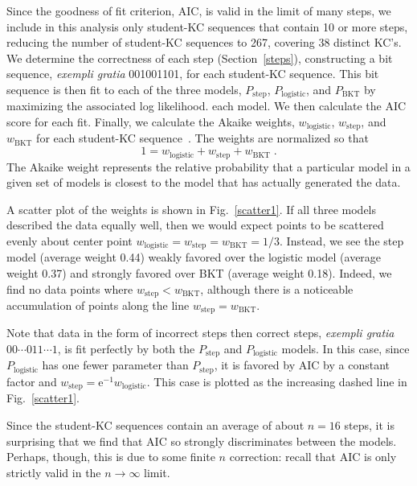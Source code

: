\documentclass{edm_template}
\begin{document}
Since the goodness of fit criterion, AIC, is valid in the limit of
many steps, we include in this analysis only student-KC sequences that
contain 10 or more steps, reducing the number of student-KC sequences
to 267, covering 38 distinct KC's.  We determine the correctness of
each step (Section~\ref{steps}), constructing a bit sequence, {\em
exempli gratia} 001001101, for each student-KC sequence.  This bit
sequence is then fit to each of the three models, $P_\mathrm{step}$,
$P_\mathrm{logistic}$, and $P_\mathrm{BKT}$ by maximizing the
associated log likelihood.  %
each model.  We then calculate the AIC score for each fit.  Finally,
we calculate the Akaike weights, $w_\mathrm{logistic}$,
$w_\mathrm{step}$, and $w_\mathrm{BKT}$ for each student-KC
sequence~\cite{burnham_model_2002}.
The weights are normalized so that
%
\begin{equation}
   1=w_\mathrm{logistic}+ w_\mathrm{step} + w_\mathrm{BKT} \; .
\end{equation}
%
The Akaike weight represents the relative probability that
a particular model in a given set of models is closest
to the model that has actually generated the data. 

A scatter plot of the weights is shown in Fig.~\ref{scatter1}.
If all three models described the data equally well, then
we would expect points to be scattered evenly about 
center point $w_\mathrm{logistic}= w_\mathrm{step}= w_\mathrm{BKT}=1/3$.
Instead, we see the step model (average weight 0.44) weakly 
favored over the logistic model (average weight 0.37) and 
strongly favored over BKT (average weight 0.18).  Indeed, we 
find no data points where $w_\mathrm{step}< w_\mathrm{BKT}$,
although there is a noticeable accumulation of points along the line 
$w_\mathrm{step}= w_\mathrm{BKT}$.

Note that data in the form of incorrect steps then correct steps, 
{\it exempli gratia} $00\cdots 011\cdots 1$,
is fit perfectly by both the $P_\mathrm{step}$ and 
$P_\mathrm{logistic}$ models.  
In this case, since $P_\mathrm{logistic}$ has one fewer parameter
than $P_\mathrm{step}$, it is favored by AIC by a constant factor and
$w_\mathrm{step}=\mathrm{e}^{-1} w_\mathrm{logistic}$.  This case is
plotted as the increasing dashed line in Fig.~\ref{scatter1}.

Since the student-KC sequences contain an average of about $n=16$ 
steps, it is surprising that we find that AIC so strongly
discriminates between the models.  Perhaps, though,  this is due to
some finite $n$ correction:  recall that AIC is only 
strictly valid in the $n\to\infty$ limit.
\end{document}
